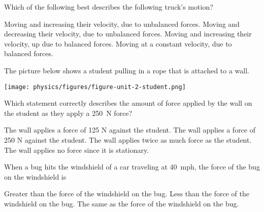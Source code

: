 \documentclass[answers]{exam}
\begin{document}
\begin{questions}
\question 
Which of the following best describes the following truck's motion?


\begin{center}
\end{center}

\begin{randomizechoices}
    \correctchoice Moving and increasing their velocity, due to unbalanced forces.
    \choice Moving and decreasing their velocity, due to unbalanced forces.
    \choice Moving and increasing their velocity, up due to balanced forces.
    \choice Moving at a constant velocity, due to balanced forces.
\end{randomizechoices}

\question 
The picture below shows a student pulling in a rope that is attached to a wall.

\begin{center}
    \texttt{[image: physics/figures/figure-unit-2-student.png]}
\end{center}

Which statement correctly describes the amount of force applied by the wall on the student as they apply a \SI{250}{N} force?
    
\begin{randomizechoices}
    \choice The wall applies a force of 125 N against the student.
    \correctchoice The wall applies a force of 250 N against the student.
    \choice The wall applies twice as much force as the student.
    \choice The wall applies no force since it is stationary.
\end{randomizechoices}

\question 
When a bug hits the windshield of a car traveling at \SI{40}{mph}, the force of the bug on the windshield is

\begin{randomizechoices}
    \choice Greater than the force of the windshield on the bug.
    \choice Less than the force of the windshield on the bug.
    \correctchoice The same as the force of the windshield on the bug.
\end{randomizechoices}


\end{questions}
\end{document}
